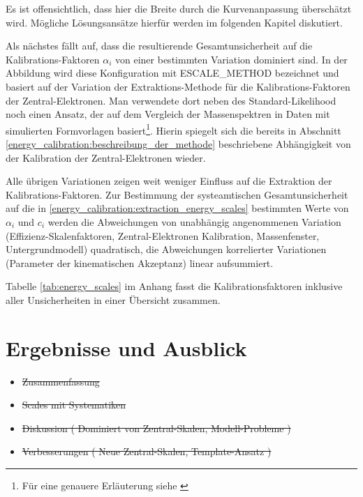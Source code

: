 Es ist offensichtlich, dass hier die Breite durch die Kurvenanpassung 
überschätzt wird. Mögliche Lösungsansätze hierfür werden im folgenden Kapitel
diskutiert.

Als nächstes fällt auf, dass die resultierende Gesamtunsicherheit auf die
Kalibrations-Faktoren $\alpha_i$ von einer bestimmten Variation dominiert sind.
In der Abbildung wird diese Konfiguration mit ESCALE\_METHOD bezeichnet und
basiert auf der Variation der Extraktions-Methode für die Kalibrations-Faktoren
der Zentral-Elektronen. Man verwendete dort neben des Standard-Likelihood noch
einen Ansatz, der auf dem Vergleich der Massenspektren in Daten mit simulierten
Formvorlagen basiert\footnote{Für eine genauere Erläuterung siehe
\cite{Agustoni:1335395}}. Hierin spiegelt sich die bereits in Abschnitt
\ref{energy_calibration:beschreibung_der_methode} beschriebene Abhängigkeit
von der Kalibration der Zentral-Elektronen wieder.

Alle übrigen Variationen zeigen weit weniger Einfluss auf die Extraktion der
Kalibrations-Faktoren. Zur Bestimmung der systeamtischen Gesamtunsicherheit auf
die in \ref{energy_calibration:extraction_energy_scales} bestimmten Werte von
$\alpha_i$ und $c_i$ werden die Abweichungen von unabhängig angenommenen
Variation (Effizienz-Skalenfaktoren, Zentral-Elektronen Kalibration,
Massenfenster, Untergrundmodell) quadratisch, die Abweichungen korrelierter
Variationen (Parameter der kinematischen Akzeptanz) linear aufsummiert.

Tabelle \ref{tab:energy_scales} im Anhang fasst die Kalibrationsfaktoren
inklusive aller Unsicherheiten in einer Übersicht zusammen.



%
\section{Ergebnisse und Ausblick}
\label{energy_calibration:ergebnisse_und_ausblick}
\begin{itemize}
    \item \sout{Zusammenfassung}
    \item \sout{Scales mit Systematiken}
    \item \sout{Diskussion ( Dominiert von Zentral-Skalen, Modell-Probleme )}
    \item \sout{Verbesserungen ( Neue Zentral-Skalen, Template-Ansatz )}
\end{itemize}

